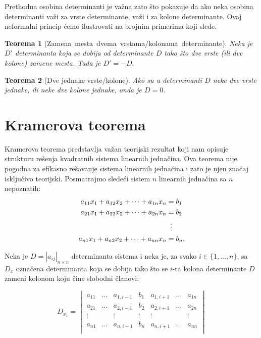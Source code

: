 \documentclass[11pt]{article}
\theoremstyle{masulthm}
\newtheorem{theorem}{Teorema}[section]
\theoremstyle{masuldef}
\theoremstyle{masulexmp}
\theoremstyle{masulproof}
\begin{document}
Prethodna osobina determinanti je važna zato što pokazuje da ako neka osobina determinanti važi za vrste
determinante, važi i za kolone determinante. Ovaj neformalni princip ćemo ilustrovati na brojnim primerima koji slede.

\begin{theorem}[\mbox{Zamena mesta dvema vrstama/kolonama determinante}]
Neka je $ D' $ determinanta koja se dobija od determinante $ D $ tako što dve vrste (ili dve kolone)
zamene mesta. Tada je $ D' = -D $.
\end{theorem}

\begin{theorem}[Dve jednake vrste/kolone]
Ako su u determinanti $ D $ neke dve vrste jednake, ili neke dve kolone jednake, onda je $ D = 0 $.
\end{theorem}



\section{Kramerova teorema}

Kramerova teorema predstavlja važan teorijski rezultat koji nam opisuje strukturu rešenja
kvadratnih sistema linearnih jednačina. Ova teorema nije pogodna za efikasno rešavanje sistema
linearnih jednačina i zato je njen značaj isključivo teorijski.
Posmatrajmo sledeći sistem $ n $ linearnih jednačina sa $ n $ nepoznatih:
\begin{align*}
    a_{11} x_1 + a_{12} x_2 + \dots + a_{1n} x_n & = b_1  \\
    a_{21} x_1 + a_{22} x_2 + \dots + a_{2n} x_n & = b_2  \\
    & \mathrel{
        \settowidth{\dimen0}{$=$}
        \hbox to \dimen0{\hss$\vdots$\hss}
    } \\
    a_{n1} x_1 + a_{n2} x_2 + \dots + a_{nn} x_n & = b_n.
\end{align*}

\noindent
Neka je $ D = |a_{ij}|_{n \times n} $ determinanta sistema i neka je, za svako $ i \in \{1, \dots, n\}$,
sa $ D_x $ označena determinanta koja se dobija tako što se $ i $-ta kolona
determinante $ D $ zameni kolonom koju čine slobodni članovi:

\begin{equation*}
    D_{x_1} =
    \begin{vmatrix}
        a_{11} & \dots & a_{1,i-1} & b_1 & a_{1,i+1} & \dots & a_{1n} \\
        a_{21} & \dots & a_{2,i-1} & b_2 & a_{2,i+1} & \dots & a_{2n} \\
        \vdots &       & \vdots    & \vdots & \vdots &       & \vdots \\
        a_{n1} & \dots & a_{n,i-1} & b_n & a_{n,i+1} & \dots & a_{nn} \\
    \end{vmatrix}
\end{equation*}
\end{document}
